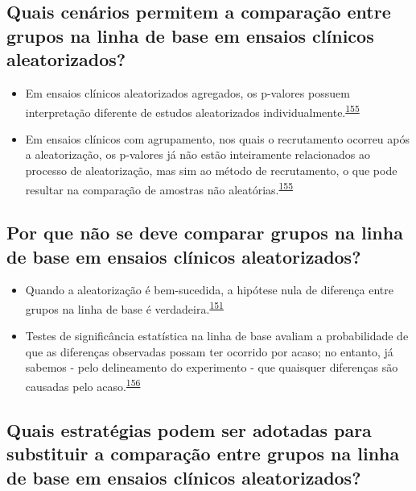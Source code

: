 \documentclass[
  a4paper,
]{book}
\begin{document}
\hypertarget{quais-cenuxe1rios-permitem-a-comparauxe7uxe3o-entre-grupos-na-linha-de-base-em-ensaios-cluxednicos-aleatorizados}{%
\subsection{Quais cenários permitem a comparação entre grupos na linha de base em ensaios clínicos aleatorizados?}\label{quais-cenuxe1rios-permitem-a-comparauxe7uxe3o-entre-grupos-na-linha-de-base-em-ensaios-cluxednicos-aleatorizados}}

\begin{itemize}
\item
  Em ensaios clínicos aleatorizados agregados, os p-valores possuem interpretação diferente de estudos aleatorizados individualmente.\textsuperscript{\protect\hyperlink{ref-Bolzern2019}{155}}
\item
  Em ensaios clínicos com agrupamento, nos quais o recrutamento ocorreu após a aleatorização, os p-valores já não estão inteiramente relacionados ao processo de aleatorização, mas sim ao método de recrutamento, o que pode resultar na comparação de amostras não aleatórias.\textsuperscript{\protect\hyperlink{ref-Bolzern2019}{155}}
\end{itemize}

\hypertarget{por-que-nuxe3o-se-deve-comparar-grupos-na-linha-de-base-em-ensaios-cluxednicos-aleatorizados}{%
\subsection{Por que não se deve comparar grupos na linha de base em ensaios clínicos aleatorizados?}\label{por-que-nuxe3o-se-deve-comparar-grupos-na-linha-de-base-em-ensaios-cluxednicos-aleatorizados}}

\begin{itemize}
\item
  Quando a aleatorização é bem-sucedida, a hipótese nula de diferença entre grupos na linha de base é verdadeira.\textsuperscript{\protect\hyperlink{ref-roberts1999}{151}}
\item
  Testes de significância estatística na linha de base avaliam a probabilidade de que as diferenças observadas possam ter ocorrido por acaso; no entanto, já sabemos - pelo delineamento do experimento - que quaisquer diferenças são causadas pelo acaso.\textsuperscript{\protect\hyperlink{ref-gruijters2020}{156}}
\end{itemize}

\hypertarget{quais-estratuxe9gias-podem-ser-adotadas-para-substituir-a-comparauxe7uxe3o-entre-grupos-na-linha-de-base-em-ensaios-cluxednicos-aleatorizados}{%
\subsection{Quais estratégias podem ser adotadas para substituir a comparação entre grupos na linha de base em ensaios clínicos aleatorizados?}\label{quais-estratuxe9gias-podem-ser-adotadas-para-substituir-a-comparauxe7uxe3o-entre-grupos-na-linha-de-base-em-ensaios-cluxednicos-aleatorizados}}
\end{document}
